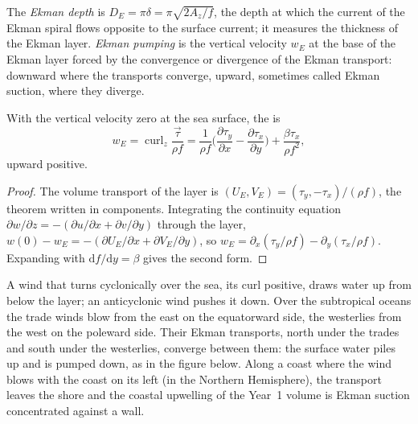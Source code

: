 \begin{definition}\label{def:b3:ocean-dynamics:ekman-pumping}
The \emph{Ekman depth} is $D_E = \pi\delta =
\pi\sqrt{2A_z/f}$, the depth at which the current of the Ekman spiral
flows opposite to the surface current; it measures the thickness of the
Ekman layer. \emph{Ekman pumping} is the vertical
velocity $w_E$ at the base of the Ekman layer forced by the convergence or
divergence of the Ekman transport: downward where the transports
converge, upward, sometimes called Ekman suction, where they diverge.
\end{definition}

\begin{proposition}\label{prop:b3:ocean-dynamics:pumping}
With the vertical velocity zero at the sea surface, the  is
\[
w_E = \operatorname{curl}_z\frac{\vec\tau}{\rho f}
= \frac{1}{\rho f}\Big(\frac{\partial\tau_y}{\partial x} -
\frac{\partial\tau_x}{\partial y}\Big) + \frac{\beta\tau_x}{\rho f^2} ,
\]
upward positive.
\end{proposition}

\begin{proof}
The volume transport of the layer is $(U_E, V_E) = (\tau_y,
-\tau_x)/(\rho f)$, the theorem written in components. Integrating the
continuity equation $\partial w/\partial z = -(\partial u/\partial x +
\partial v/\partial y)$ through the layer, $w(0) - w_E = -(\partial
U_E/\partial x + \partial V_E/\partial y)$, so $w_E = \partial_x(\tau_y/\rho
f) - \partial_y(\tau_x/\rho f)$. Expanding with $\mathrm df/\mathrm dy =
\beta$ gives the second form.
\end{proof}

A wind that turns cyclonically over the sea, its curl positive, draws
water up from below the layer; an anticyclonic wind pushes it down. Over
the subtropical oceans the trade winds blow from the east on the
equatorward side, the westerlies from the west on the poleward side. Their Ekman
transports, north under the trades and south under the westerlies,
converge between them: the surface water piles up and is pumped down, as
in the figure below. Along a coast where the
wind blows with the coast on its left (in the Northern Hemisphere), the
transport leaves the shore and the coastal upwelling of the Year~1 volume
is Ekman suction concentrated against a wall.


